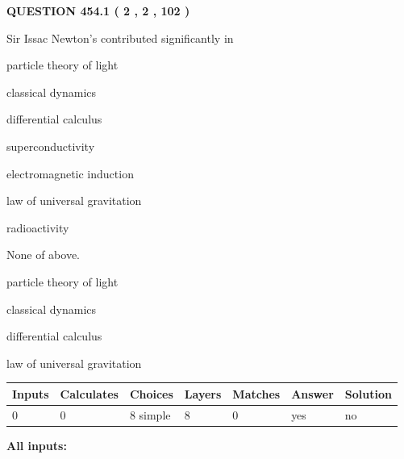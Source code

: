 \documentclass[12pt]{article}
\begin{document}
{\textbf{\Large{QUESTION
454.1 
 ( 2 , 2 , 102 )
}}}
  
  
Sir Issac Newton's contributed significantly in
 
 
particle theory of light
 
 
classical dynamics
 
 
differential calculus
 
 
superconductivity
 
 
electromagnetic induction
 
 
law of universal gravitation
 
 
radioactivity
 
 
 None of above.
 
 
\noindent{}
 
 
particle theory of light
 
 
classical dynamics
 
 
differential calculus
 
 
law of universal gravitation
 
 
\noindent{}
 
 
   
   
   
   
\noindent\begin{tabular}{|l|l|l|l|l|l|l|}
 \hline
Inputs & Calculates & Choices & Layers & Matches & Answer & Solution \\ \hline
 0  & 
 0  & 
 8
  simple  
  & 
 8  & 
 0  & 
  yes & 
  no 
  \\ \hline
 \end{tabular}
   
   
   
   
\noindent{}
   
   
   
   
\noindent\vspace{0.1in}\hspace{-0.08in} {\textbf{\Large{All inputs: }}}
   
\end{document}
